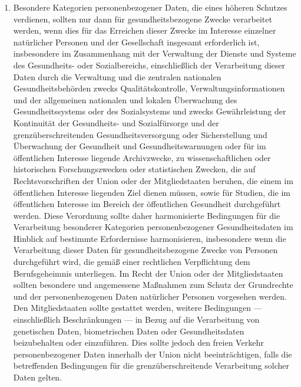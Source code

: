 \begin{enumerate}
   \item Besondere Kategorien personenbezogener Daten, die eines höheren Schutzes verdienen, sollten nur dann für
    gesundheitsbezogene Zwecke verarbeitet werden, wenn dies für das Erreichen dieser Zwecke im Interesse einzelner
    natürlicher Personen und der Gesellschaft insgesamt erforderlich ist, insbesondere im Zusammenhang mit der
    Verwaltung der Dienste und Systeme des Gesundheits- oder Sozialbereichs, einschließlich der Verarbeitung dieser
    Daten durch die Verwaltung und die zentralen nationalen Gesundheitsbehörden zwecks Qualitätskontrolle,
    Verwaltungsinformationen und der allgemeinen nationalen und lokalen Überwachung des Gesundheitssystems oder des
    Sozialsystems und zwecks Gewährleistung der Kontinuität der Gesundheits- und Sozialfürsorge und der
    grenzüberschreitenden Gesundheitsversorgung oder Sicherstellung und Überwachung der Gesundheit und
    Gesundheitswarnungen oder für im öffentlichen Interesse liegende Archivzwecke, zu wissenschaftlichen oder
    historischen Forschungszwecken oder statistischen Zwecken, die auf Rechtsvorschriften der Union oder der
    Mitgliedstaaten beruhen, die einem im öffentlichen Interesse liegenden Ziel dienen müssen, sowie für Studien, die
    im öffentlichen Interesse im Bereich der öffentlichen Gesundheit durchgeführt werden. Diese Verordnung sollte daher
    harmonisierte Bedingungen für die Verarbeitung besonderer Kategorien personenbezogener Gesundheitsdaten im Hinblick
    auf bestimmte Erfordernisse harmonisieren, insbesondere wenn die Verarbeitung dieser Daten für gesundheitsbezogene
    Zwecke von Personen durchgeführt wird, die gemäß einer rechtlichen Verpflichtung dem Berufsgeheimnis unterliegen.
    Im Recht der Union oder der Mitgliedstaaten sollten besondere und angemessene Maßnahmen zum Schutz der Grundrechte
    und der personenbezogenen Daten natürlicher Personen vorgesehen werden. Den Mitgliedstaaten sollte gestattet
    werden, weitere Bedingungen — einschließlich Beschränkungen — in Bezug auf die Verarbeitung von genetischen Daten,
    biometrischen Daten oder Gesundheitsdaten beizubehalten oder einzuführen. Dies sollte jedoch den freien Verkehr
    personenbezogener Daten innerhalb der Union nicht beeinträchtigen, falls die betreffenden Bedingungen für die
    grenzüberschreitende Verarbeitung solcher Daten gelten.%
   \label{eg:53}
   


\end{enumerate}
